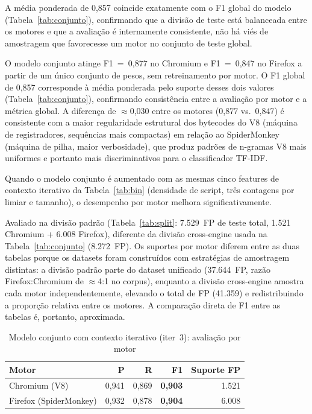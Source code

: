 A média ponderada de 0,857 coincide exatamente com o F1 global do modelo
(Tabela~\ref{tab:conjunto}), confirmando que a divisão de teste está balanceada entre os
motores e que a avaliação é internamente consistente, não há viés de amostragem
que favorecesse um motor no conjunto de teste global.

O modelo conjunto atinge F1~=~0,877 no Chromium e F1~=~0,847 no Firefox a partir
de um único conjunto de pesos, sem retreinamento por motor. O F1 global de 0,857
corresponde à média ponderada pelo suporte desses dois valores (Tabela~\ref{tab:conjunto}),
confirmando consistência entre a avaliação por motor e a métrica global.
A diferença de $\approx$0,030 entre os motores (0,877 vs.\ 0,847) é consistente com
a maior regularidade estrutural dos bytecodes do V8 (máquina de registradores, sequências
mais compactas) em relação ao SpiderMonkey (máquina de pilha, maior verbosidade), que
produz padrões de n-gramas V8 mais uniformes e portanto mais discriminativos para o
classificador TF-IDF.

Quando o modelo conjunto é aumentado com as mesmas cinco features de contexto
iterativo da Tabela~\ref{tab:bin} (densidade de script, três contagens por limiar e
tamanho), o desempenho por motor melhora significativamente.

\begin{table}[htb]
\centering
\caption{Modelo conjunto com contexto iterativo (iter~3): avaliação por motor}
\label{tab:conjunto-iter}
{\footnotesize
Avaliado na divisão padrão (Tabela~\ref{tab:split}: 7.529~FP de teste total,
1.521 Chromium + 6.008 Firefox), diferente da divisão cross-engine usada na
Tabela~\ref{tab:conjunto} (8.272~FP). Os suportes por motor diferem entre as
duas tabelas porque os datasets foram construídos com estratégias de amostragem
distintas: a divisão padrão parte do dataset unificado (37.644~FP, razão
Firefox:Chromium de $\approx$4:1 no corpus), enquanto a divisão cross-engine
amostra cada motor independentemente, elevando o total de FP (41.359) e
redistribuindo a proporção relativa entre os motores. A comparação direta
de F1 entre as tabelas é, portanto, aproximada.
}

\bigskip
\begin{tabular}{lrrrr}
\toprule
\textbf{Motor} & \textbf{P} & \textbf{R} & \textbf{F1} & \textbf{Suporte FP} \\
\midrule
Chromium (V8)            & 0,941 & 0,869 & \textbf{0,903} & 1.521 \\
Firefox (SpiderMonkey)   & 0,932 & 0,878 & \textbf{0,904} & 6.008 \\
\bottomrule
\end{tabular}

\end{table}

